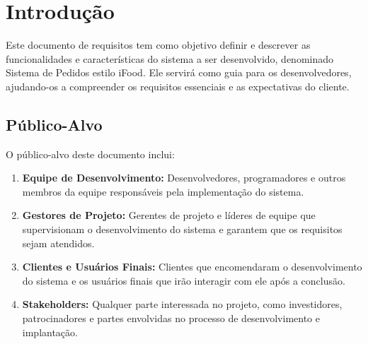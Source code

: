 \chapter{Introdução} \label{Introducao}

Este documento de requisitos tem como objetivo definir e descrever as funcionalidades e características do sistema a ser desenvolvido, denominado Sistema de Pedidos estilo iFood. Ele servirá como guia para os desenvolvedores, ajudando-os a compreender os requisitos essenciais e as expectativas do cliente.

\section{Público-Alvo}



O público-alvo deste documento inclui:

\begin{enumerate}
    \item \textbf{Equipe de Desenvolvimento:} Desenvolvedores, programadores e outros membros da equipe responsáveis pela implementação do sistema.
    
    \item \textbf{Gestores de Projeto:} Gerentes de projeto e líderes de equipe que supervisionam o desenvolvimento do sistema e garantem que os requisitos sejam atendidos.
    
    \item \textbf{Clientes e Usuários Finais:} Clientes que encomendaram o desenvolvimento do sistema e os usuários finais que irão interagir com ele após a conclusão.
    
    \item \textbf{Stakeholders:} Qualquer parte interessada no projeto, como investidores, patrocinadores e partes envolvidas no processo de desenvolvimento e implantação.
\end{enumerate}